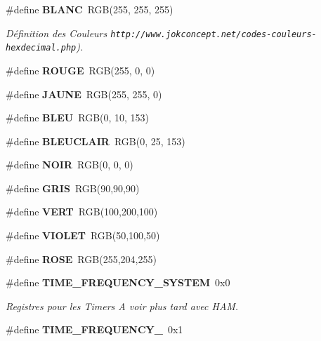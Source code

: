 \begin{DoxyCompactItemize}
\item 
\#define {\bf BLANC}~RGB(255, 255, 255)\label{main_8h_a4371941fa5aa27c04b3e2b973c39f4b0}

\begin{DoxyCompactList}\small\item\em Définition des Couleurs {\tt http://www.jokconcept.net/codes-\/couleurs-\/hexdecimal.php}). \item\end{DoxyCompactList}\item 
\#define {\bfseries ROUGE}~RGB(255, 0, 0)\label{main_8h_a358a59dd21062085dd34d5c228c5f136}

\item 
\#define {\bfseries JAUNE}~RGB(255, 255, 0)\label{main_8h_a34c109ff6a0293c4706defe141ef7e0c}

\item 
\#define {\bfseries BLEU}~RGB(0, 10, 153)\label{main_8h_ae22837728df88da892b4bb16bb98296d}

\item 
\#define {\bfseries BLEUCLAIR}~RGB(0, 25, 153)\label{main_8h_a580c4099c9eebb5a78c919f1ca91e837}

\item 
\#define {\bfseries NOIR}~RGB(0, 0, 0)\label{main_8h_a8a711bd77f878f23e61dfd98fc505a1c}

\item 
\#define {\bfseries GRIS}~RGB(90,90,90)\label{main_8h_a53a157dfb1d9f76fd0a9e0205d067143}

\item 
\#define {\bfseries VERT}~RGB(100,200,100)\label{main_8h_a22c2b7cb14b1ffb516a9ed4a164b5cda}

\item 
\#define {\bfseries VIOLET}~RGB(50,100,50)\label{main_8h_a928ad872921809adddfdd7f5d260fac0}

\item 
\#define {\bfseries ROSE}~RGB(255,204,255)\label{main_8h_a30283739677a9ab6664959f69e2d8dde}

\item 
\#define {\bf TIME\_\-FREQUENCY\_\-SYSTEM}~0x0\label{main_8h_a438eb6dd7a056a16938c5f2bf8e4282b}

\begin{DoxyCompactList}\small\item\em Registres pour les Timers A voir plus tard avec HAM. \item\end{DoxyCompactList}\item 
\#define {\bfseries TIME\_\-FREQUENCY\_}~0x1\label{main_8h_a251e1209bdd6cfbeba1e8be691b82a9a}


\end{DoxyCompactItemize}
